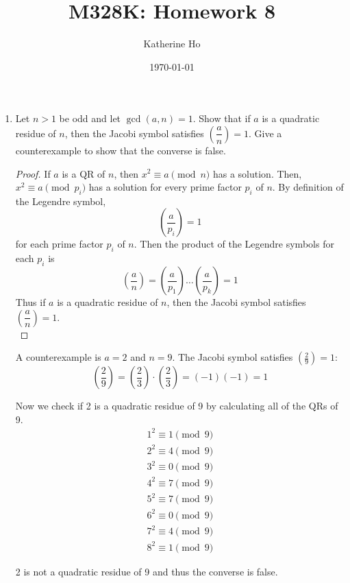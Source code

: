 \documentclass[11pt]{article}
\title{M328K: Homework 8}
\author{Katherine Ho}
\date\today
\theoremstyle{definition}
\newcommand{\leg}[2]{\genfrac(){}{0}{#1}{#2}}
\newcommand{\legp}[1]{\leg{#1}{p}}
\newcommand{\legendre}[2]{\ensuremath{\left( \frac{#1}{#2} \right) }}
\newcommand{\Mod}[1]{\ (\mathrm{mod}\ #1)}
\begin{document}
\maketitle

\begin{enumerate}
    \item Let $n>1$ be odd and let $\gcd(a,n)=1$. Show that if $a$ is a quadratic residue of $n$, then the Jacobi symbol satisfies $\leg{a}{n} = 1.$ Give a counterexample to show that the converse is false.
    \begin{proof}
        If $a$ is a QR of $n$, then $x^2\equiv a\pmod{n}$ has a solution.
        Then, $x^2\equiv a\pmod{p_i}$ has a solution for every prime factor $p_i$ of $n$. 
        By definition of the Legendre symbol, 
        \[
            \legendre{a}{p_i} = 1
        \]
        for each prime factor $p_i$ of $n$.
        Then the product of the Legendre symbols for each $p_i$ is
        \[
            \legendre{a}{n} = \legendre{a}{p_1} \dots \legendre{a}{p_k} = 1
        \]
        Thus if $a$ is a quadratic residue of $n$, then the Jacobi symbol satisfies $\leg{a}{n} = 1.$ \\
    \end{proof}

        A counterexample is $a=2$ and $n=9$. 
        The Jacobi symbol satisfies $\legendre{2}{9} = 1$:
        \[
            \legendre{2}{9} = \legendre{2}{3}\cdot \legendre{2}{3} = (-1)(-1) = 1
        \]

        Now we check if 2 is a quadratic residue of 9 by calculating all of the QRs of 9. 
        \begin{align*}
            1^2 \equiv 1 \pmod{9} \\
            2^2 \equiv 4 \pmod{9} \\
            3^2 \equiv 0 \pmod{9} \\
            4^2 \equiv 7 \pmod{9} \\
            5^2 \equiv 7 \pmod{9} \\
            6^2 \equiv 0 \pmod{9} \\
            7^2 \equiv 4 \pmod{9} \\
            8^2 \equiv 1 \pmod{9}
        \end{align*}
        
        2 is not a quadratic residue of 9 and thus the converse is false.



\end{enumerate}
\end{document}
